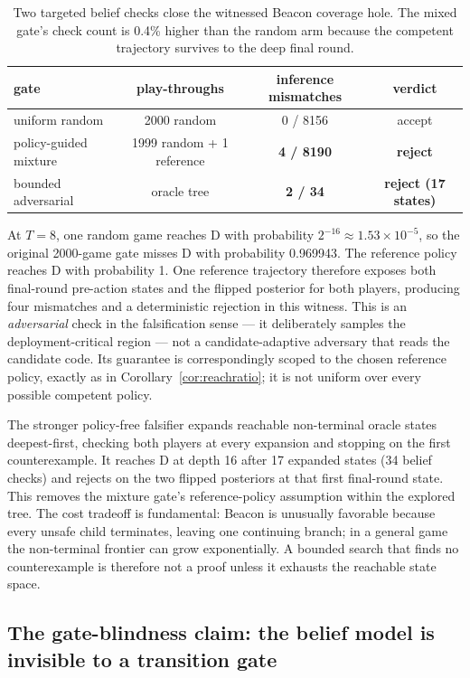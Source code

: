 \documentclass[11pt]{article}
\theoremstyle{remark}
\begin{document}
\begin{table}[ht]
\centering
\small
\begin{tabular}{lccc}
\toprule
gate & play-throughs & inference mismatches & verdict \\
\midrule
uniform random & 2000 random & 0 / 8156 & accept \\
policy-guided mixture & 1999 random + 1 reference & \textbf{4 / 8190} & \textbf{reject} \\
bounded adversarial & oracle tree & \textbf{2 / 34} & \textbf{reject (17 states)} \\
\bottomrule
\end{tabular}
\caption{Two targeted belief checks close the witnessed Beacon coverage hole. The mixed gate's check count is 0.4\% higher than the random arm because the competent trajectory survives to the deep final round.}
\label{tab:beaconadversarialgate}
\end{table}

At $T=8$, one random game reaches D with probability $2^{-16} \approx 1.53\times10^{-5}$, so the original 2000-game gate misses D with probability 0.969943. The reference policy reaches D with probability 1. One reference trajectory therefore exposes both final-round pre-action states and the flipped posterior for both players, producing four mismatches and a deterministic rejection in this witness. This is an \emph{adversarial} check in the falsification sense --- it deliberately samples the deployment-critical region --- not a candidate-adaptive adversary that reads the candidate code. Its guarantee is correspondingly scoped to the chosen reference policy, exactly as in Corollary~\ref{cor:reachratio}; it is not uniform over every possible competent policy.

The stronger policy-free falsifier expands reachable non-terminal oracle states deepest-first, checking both players at every expansion and stopping on the first counterexample. It reaches D at depth 16 after 17 expanded states (34 belief checks) and rejects on the two flipped posteriors at that first final-round state. This removes the mixture gate's reference-policy assumption within the explored tree. The cost tradeoff is fundamental: Beacon is unusually favorable because every unsafe child terminates, leaving one continuing branch; in a general game the non-terminal frontier can grow exponentially. A bounded search that finds no counterexample is therefore not a proof unless it exhausts the reachable state space.

\subsection{The gate-blindness claim: the belief model is invisible to a transition gate}
\label{sec:gate-blindness}
\end{document}
